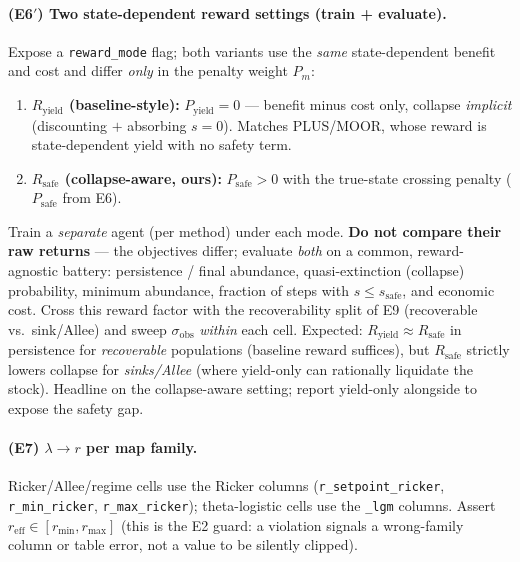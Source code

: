 \documentclass[11pt]{article}
\newcommand{\reff}{r_{\mathrm{eff}}}
\newcommand{\rmax}{r_{\max}}
\newcommand{\rmin}{r_{\min}}
\newcommand{\sobs}{\sigma_{\mathrm{obs}}}
\newcommand{\ssafe}{s_{\mathrm{safe}}}
\newcommand{\code}[1]{\texttt{#1}}
\begin{document}
\paragraph{(E6$'$) Two state-dependent reward settings (train + evaluate).}
Expose a \code{reward\_mode} flag; both variants use the \emph{same} state-dependent
benefit and cost and differ \emph{only} in the penalty weight $P_m$:
\begin{enumerate}[leftmargin=1.8em,nosep]
\item \textbf{$R_{\mathrm{yield}}$ (baseline-style):} $P_{\mathrm{yield}}{=}0$ --- benefit
minus cost only, collapse \emph{implicit} (discounting $+$ absorbing $s{=}0$). Matches
PLUS/MOOR, whose reward is state-dependent yield with no safety term.
\item \textbf{$R_{\mathrm{safe}}$ (collapse-aware, ours):} $P_{\mathrm{safe}}{>}0$ with the
true-state crossing penalty ($P_{\mathrm{safe}}$ from E6).
\end{enumerate}
Train a \emph{separate} agent (per method) under each mode. \textbf{Do not compare their
raw returns} --- the objectives differ; evaluate \emph{both} on a common, reward-agnostic
battery: persistence / final abundance, quasi-extinction (collapse) probability, minimum
abundance, fraction of steps with $s\le\ssafe$, and economic cost. Cross this reward
factor with the recoverability split of E9 (recoverable vs.\ sink/Allee) and sweep
$\sobs$ \emph{within} each cell. Expected: $R_{\mathrm{yield}}\approx R_{\mathrm{safe}}$ in
persistence for \emph{recoverable} populations (baseline reward suffices), but
$R_{\mathrm{safe}}$ strictly lowers collapse for \emph{sinks/Allee} (where yield-only can
rationally liquidate the stock). Headline on the collapse-aware setting; report yield-only
alongside to expose the safety gap.

\paragraph{(E7) $\lambda\to r$ per map family.}
Ricker/Allee/regime cells use the Ricker columns
(\texttt{r\_setpoint\_}\allowbreak\texttt{ricker}, \code{r\_min\_ricker},
\code{r\_max\_ricker}); theta-logistic cells use the \code{\_lgm} columns.
Assert $\reff\in[\rmin,\rmax]$ (this is the E2 guard: a violation signals a
wrong-family column or table error, not a value to be silently clipped).
\end{document}
